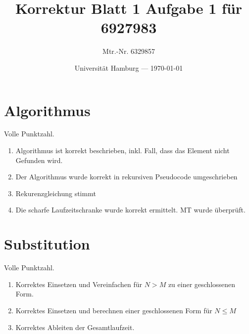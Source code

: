 \documentclass[parskip=half,a4paper]{scrartcl}
\title{Korrektur Blatt 1 Aufgabe 1 für 6927983}
\author{Mtr.-Nr. 6329857}
\date{Universität Hamburg --- \today}
\begin{document}
\maketitle %

\section*{Algorithmus}

Volle Punktzahl.

\begin{enumerate}
    \item Algorithmus ist korrekt beschrieben, inkl. Fall, dass das Element nicht Gefunden wird. \checkmark
    \item Der Algorithmus wurde korrekt in rekursiven Pseudocode umgeschrieben \checkmark
    \item Rekurenzgleichung stimmt \checkmark
    \item Die scharfe Laufzeitschranke wurde korrekt ermittelt. MT wurde überprüft. \checkmark
\end{enumerate}

\section*{Substitution}



Volle Punktzahl.

\begin{enumerate}
\item Korrektes Einsetzen und Vereinfachen für $N > M$ zu einer geschlossenen Form. \checkmark
\item Korrektes Einsetzen und berechnen einer geschlossenen Form für $N \le M$ \checkmark
\item Korrektes Ableiten der Gesamtlaufzeit. \checkmark
\end{enumerate}
\end{document}
